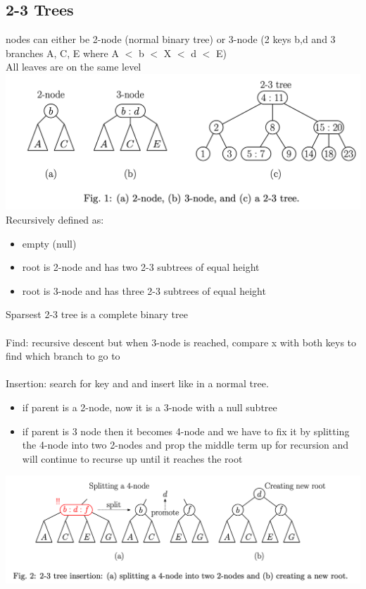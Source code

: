 \documentclass{article}
\begin{document}
  \subsection{2-3 Trees}
  nodes can either be 2-node (normal binary tree) or 3-node (2 keys b,d and 3 branches A, C, E where A $<$ b $<$ X $<$ d $<$ E)\\
  All leaves are on the same level \\
  \includegraphics[width=\textwidth]{2-3Tree}
  Recursively defined as:
  \begin{itemize}[noitemsep]
  \item empty (null)
  \item root is 2-node and has two 2-3 subtrees of equal height
  \item root is 3-node and has three 2-3 subtrees of equal height
  \end{itemize}
  Sparsest 2-3 tree is a complete binary tree \\ \\
  Find: recursive descent but when 3-node is reached, compare x with both keys to find which branch to go to\\ \\
  Insertion: search for key and and insert like in a normal tree.
  \begin{itemize}[noitemsep]
  \item if parent is a 2-node, now it is a 3-node with a null subtree
  \item if parent is 3 node then it becomes 4-node and we have to fix it by splitting the 4-node into two 2-nodes and prop the middle term up for recursion and will continue to recurse up until it reaches the root \\
  \end{itemize}
  \includegraphics[width=\textwidth]{2-3TreeInsert}
\end{document}
